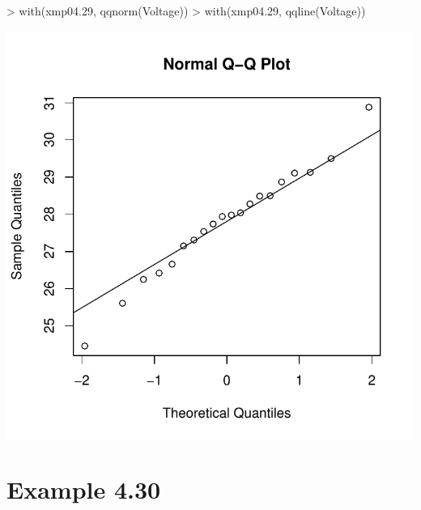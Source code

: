 \documentclass{book}
\begin{document}
\begin{center}
\begin{Schunk}
\begin{Sinput}
> with(xmp04.29, qqnorm(Voltage))
> with(xmp04.29, qqline(Voltage))
\end{Sinput}
\end{Schunk}
\includegraphics{Devore6-xmp0429}
\end{center}


\section{Example 4.30}
\label{sec:xmp0430}
\end{document}
